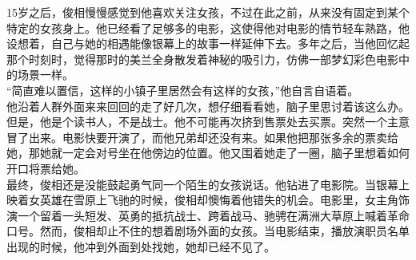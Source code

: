 15岁之后，俊相慢慢感觉到他喜欢关注女孩，不过在此之前，从来没有固定到某个特定的女孩身上。他已经看了足够多的电影，这使得他对电影的情节轻车熟路，他设想着，自己与她的相遇能像银幕上的故事一样延伸下去。多年之后，当他回忆起那个时刻时，觉得那时的美兰全身散发着神秘的吸引力，仿佛一部梦幻彩色电影中的场景一样。\\

“简直难以置信，这样的小镇子里居然会有这样的女孩，”他自言自语着。\\

他沿着人群外面来来回回的走了好几次，想仔细看看她，脑子里思讨着该这么办。但是，他是个读书人，不是战士。他不可能再次挤到售票处去买票。突然一个主意冒了出来。电影快要开演了，而他兄弟却还没有来。如果他把那张多余的票卖给她，那她就一定会对号坐在他傍边的位置。他又围着她走了一圈，脑子里想着如何开口将票给她。\\

最终，俊相还是没能鼓起勇气同一个陌生的女孩说话。他钻进了电影院。当银幕上映着女英雄在雪原上飞驰的时候，俊相却懊悔着他错失的机会。电影里，女主角饰演一个留着一头短发、英勇的抵抗战士、跨着战马、驰骋在满洲大草原上喊着革命口号。然而，俊相却止不住的想着剧场外面的女孩。当电影结束，播放演职员名单出现的时候，他冲到外面到处找她，她却已经不见了。\\
